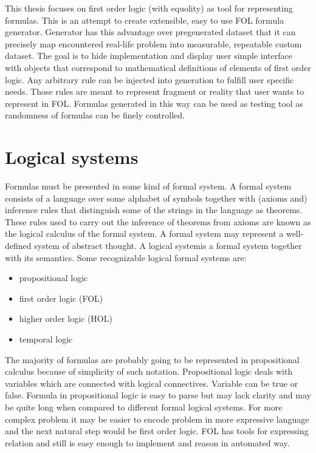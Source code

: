 This thesis focuses on first order logic (with equolity) as tool for representing formulas. This is an attempt to create extensible, easy to use \gls{FOL} formula generator. Generator has this advantage over pregenerated dataset that it can precisely map encountered real-life problem into measurable, repeatable custom dataset. The goal is to hide implementation and display user simple interface with objects that correspond to mathematical definitions of elements of first order logic. Any arbitrary rule can be injected into generation to fulfill user specific needs. Those rules are meant to represent fragment or reality that user wants to represent in \gls{FOL}. Formulas generated in this way can be used as testing tool as randomness of formulas can be finely controlled. 


\chapter{Logical systems}

Formulas must be presented in some kind of formal system. A formal system consists of a language over some alphabet of symbols together with (axioms and) inference rules that distinguish some of the strings in the language as theorems. These rules used to carry out the inference of theorems from axioms are known as the logical calculus of the formal system. A formal system may represent a well-defined system of abstract thought. A logical systemis a formal system together with its semantics. Some recognizable logical formal systems are:

\begin{itemize}
  \item propositional logic 
  \item first order logic (FOL)
  \item higher order logic (HOL)
  \item temporal logic 
\end{itemize}

The majority of formulas are probably going to be represented in propositional calculus because of simplicity of such notation. Propositional logic deals with variables which are connected with logical connectives. Variable can be true or false. Formula in propositional logic is easy to parse but may lack clarity and may be quite long when compared to different formal logical systems. For more complex problem it may be easier to encode problem in more expressive language and the next natural step would be first order logic. \gls{FOL} has tools for expressing relation and still is easy enough to implement and reason in automated way. 

